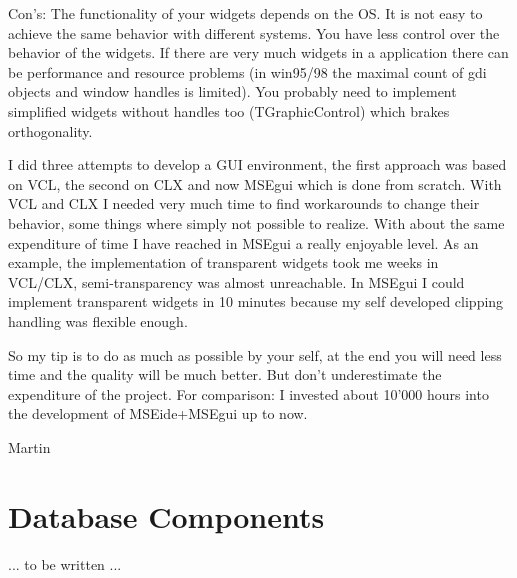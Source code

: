 \documentclass[a4paper,11pt]{report}
\begin{document}
Con's:
The functionality of your widgets depends on the OS. It is not easy to
achieve the same behavior with different systems.
You have less control over the behavior of the widgets.
If there are very much widgets in a application there can be performance
and resource problems (in win95/98 the maximal count of gdi objects and
window handles is limited). 
You probably need to implement simplified widgets without handles too
(TGraphicControl) which brakes orthogonality.

I did three attempts to develop a GUI environment, the first approach
was based on VCL, the second on CLX and now MSEgui which is done from
scratch.
With VCL and CLX I needed very much time to find workarounds to change
their behavior, some things where simply not possible to realize.
With about the same expenditure of time I have reached in MSEgui a
really enjoyable level.
As an example, the implementation of transparent widgets took me weeks
in VCL/CLX, semi-transparency was almost unreachable.
In MSEgui I could implement transparent widgets in 10 minutes because my
self developed clipping handling was flexible enough.

So my tip is to do as much as possible by your self, at the end you will
need less time and the quality will be much better.
But don't underestimate the expenditure of the project.
For comparison: I invested about 10'000 hours into the development of
MSEide+MSEgui up to now.

Martin 

\chapter{Database Components}

... to be written ...
\end{document}
